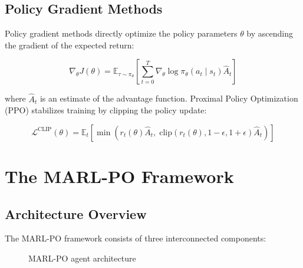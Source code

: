 \documentclass[12pt,a4paper]{report}
\begin{document}
\section{Policy Gradient Methods}
Policy gradient methods directly optimize the policy parameters $\theta$ by ascending the gradient
of the expected return:

\begin{equation}
\nabla_\theta J(\theta) = \mathbb{E}_{\tau \sim \pi_\theta}\left[
    \sum_{t=0}^{T} \nabla_\theta \log \pi_\theta(a_t \mid s_t) \hat{A}_t
\right]
\label{eq:policy_gradient}
\end{equation}

where $\hat{A}_t$ is an estimate of the advantage function. Proximal Policy Optimization (PPO)
\cite{schulman2017proximal} stabilizes training by clipping the policy update:

\begin{equation}
\mathcal{L}^{\text{CLIP}}(\theta) = \mathbb{E}_t\left[
    \min\left(
        r_t(\theta) \hat{A}_t,\;
        \text{clip}(r_t(\theta), 1 - \epsilon, 1 + \epsilon) \hat{A}_t
    \right)
\right]
\label{eq:ppo_clip}
\end{equation}

\chapter{The MARL-PO Framework}
\label{ch:framework}

\section{Architecture Overview}
The MARL-PO framework consists of three interconnected components:

\begin{figure}[htbp]
    \centering
    \caption{MARL-PO agent architecture}
    \label{fig:architecture}
\end{figure}
\end{document}
